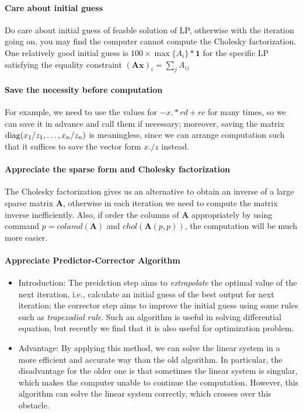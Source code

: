 \paragraph{Care about initial guess}Do care about initial guess of feasble solution of LP, otherwise with the iteration going on,  you may find the computer cannot compute the Cholesky factorization. One relatively good initial guess is $100\times\max\{A_i\}*\bm1$ for the specific LP satisfying the equality constraint $(\bm{Ax})_i=\sum_jA_{ij}$
\paragraph{Save the necessity before computation}
For example, we need to use the values for $-x.*rd+rc$ for many times, so we can save it in advance and call them if necessary; moreover, saving the matrix $\operatorname{diag}(x_1/z_1,\dots,x_n/z_n)$ is meaningless, since we can arrange computation such that it suffices to save the vector form $x./z$ instead.
\paragraph{Appreciate the sparse form and Cholesky factorization}
The Cholesky factorization gives us an alternative to obtain an inverse of a large sparse matrix $\bm A$, otherwise in each iteration we need to compute the matrix inverse inefficiently. Also, if order the columns of $\bm A$ appropriately by using command $p=colamd(\bm A)$ and $chol(\bm A(p,p))$, the computation will be much more easier.
\paragraph{Appreciate Predictor-Corrector Algorithm}
\begin{itemize}
\item
Introduction: The preidction step aims to \emph{extrapolate} the optimal value of the next iteration, i.e., calculate an initial guess of the best output for next iteration; the corrector step aims to improve the initial guess using some rules such as \emph{trapezodial rule}. Such an algorithm is useful in solving differential equation, but recently we find that it is also useful for optimization problem.
\item
Advantage: By applying this method, we can solve the linear system in a more efficient and accurate way than the old algorithm. In particular, the disadvantage for the older one is that sometimes the linear system is singular, which makes the computer unable to continue the computation. However, this algorithm can solve the linear system correctly, which crosses over this obstacle.
\end{itemize} 














